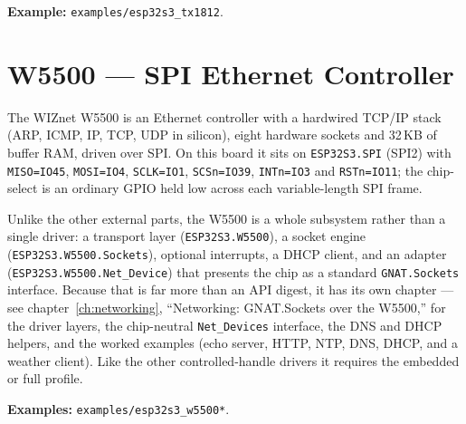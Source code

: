 \noindent\textbf{Example:} \texttt{examples/esp32s3\_tx1812}.

\section{W5500 --- SPI Ethernet Controller}
\label{app:ext:w5500}

The WIZnet W5500 is an Ethernet controller with a hardwired TCP/IP stack (ARP,
ICMP, IP, TCP, UDP in silicon), eight hardware sockets and 32\,KB of buffer RAM,
driven over SPI. On this board it sits on \texttt{ESP32S3.SPI} (SPI2) with
\texttt{MISO=IO45}, \texttt{MOSI=IO4}, \texttt{SCLK=IO1}, \texttt{SCSn=IO39},
\texttt{INTn=IO3} and \texttt{RSTn=IO11}; the chip-select is an ordinary GPIO held
low across each variable-length SPI frame.

Unlike the other external parts, the W5500 is a whole subsystem rather than a single
driver: a transport layer (\texttt{ESP32S3.W5500}), a socket engine
(\texttt{ESP32S3.W5500.Sockets}), optional interrupts, a DHCP client, and an adapter
(\texttt{ESP32S3.W5500.Net\_Device}) that presents the chip as a standard
\texttt{GNAT.Sockets} interface. Because that is far more than an API digest, it has
its own chapter --- see chapter~\ref{ch:networking}, ``Networking: GNAT.Sockets over
the W5500,'' for the driver layers, the chip-neutral \texttt{Net\_Devices}
interface, the DNS and DHCP helpers, and the worked examples (echo server, HTTP,
NTP, DNS, DHCP, and a weather client). Like the other controlled-handle drivers it
requires the embedded or full profile.

\noindent\textbf{Examples:} \texttt{examples/esp32s3\_w5500*}.
